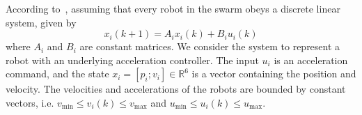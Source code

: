 According to~\cite{Soria2021}, assuming that every robot in the swarm obeys a discrete linear system, given by
\begin{equation}
    x_i(k+1)=A_ix_i(k) + B_iu_i(k)
\end{equation}
where $A_i$ and $B_i$ are constant matrices. We consider the system to represent a robot with an underlying acceleration controller. The input $u_i$ is an acceleration command, and the state $x_i=\left[p_i;v_i\right]\in\mathbb{R}^6$ is a vector containing the position and velocity. The velocities and accelerations of the robots are bounded by constant vectors, i.e. $v_\text{min}\leq v_i(k)\leq v_\text{max}$ and $u_\text{min}\leq u_i(k)\leq u_\text{max}$.